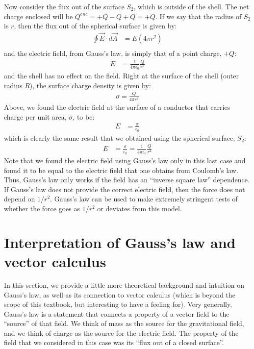Now consider the flux out of the surface $S_2$, which is outside of the shell. The net charge enclosed will be $Q^{enc}=+Q-Q+Q=+Q$. If we say that the radius of $S_2$ is $r$,  then the flux out of the spherical surface is given by:
\begin{align*}
\oint \vec E\cdot d\vec A &= E(4\pi r^2)\\
\end{align*}
and the electric field, from Gauss's law, is simply that of a point charge, $+Q$:
\begin{align*}
E&=\frac{1}{4\pi\epsilon_0}\frac{Q}{r^2}
\end{align*}
and the shell has no effect on the field. Right at the surface of the shell (outer radius $R$), the surface charge density is given by:
\begin{align*}
\sigma=\frac{Q}{4\pi r^2}
\end{align*}
Above, we found the electric field at the surface of a conductor that carries charge per unit area, $\sigma$, to be:
\begin{align*}
E&= \frac{\sigma}{\epsilon_0}
\end{align*}
which is clearly the same result that we obtained using the spherical surface, $S_2$:
\begin{align*}
E&= \frac{\sigma}{\epsilon_0}=\frac{1}{4\pi\epsilon_0}\frac{Q}{r^2}
\end{align*}
Note that we found the electric field using Gauss's law only in this last case and found it to be equal to the electric field that one obtains from Coulomb's law. Thus, Gauss's law only works if the field has an ``inverse square law'' dependence. If Gauss's law does not provide the correct electric field, then the force does not depend on $1/r^2$. Gauss's law can be used to make extremely stringent tests of whether the force goes as $1/r^2$ or deviates from this model.

\section{Interpretation of Gauss's law and vector calculus}
\label{sec:gauss:interpretation}
In this section, we provide a little more theoretical background and intuition on Gauss's law, as well as its connection to vector calculus (which is beyond the scope of this textbook, but interesting to have a feeling for). Very generally, Gauss's law is a statement that connects a property of a vector field to the ``source'' of that field. We think of mass as the source for the gravitational field, and we think of charge as the source for the electric field. The property of the field that we considered in this case was its ``flux out of a closed surface''.

